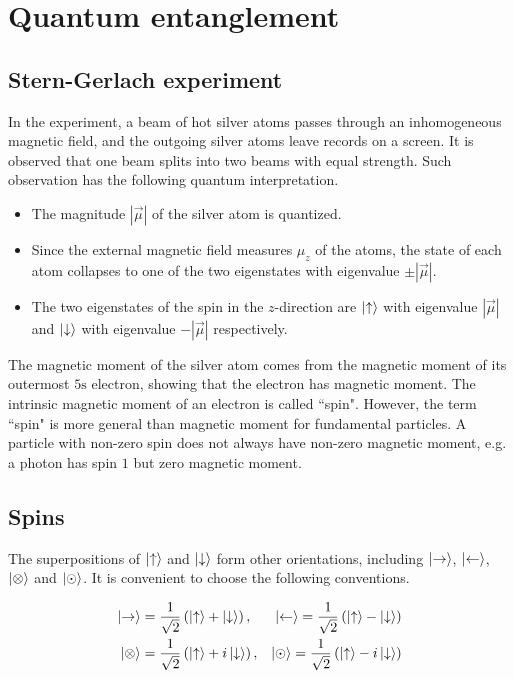 \documentclass[12pt]{book} %
\numberwithin{equation}{chapter}
\begin{document}
\newpage
{} %
\chapter{Quantum entanglement}
\section{Stern-Gerlach experiment}
In the experiment, a beam of hot silver atoms passes through an inhomogeneous magnetic field, and the outgoing silver atoms leave records on a screen. It is observed that one beam splits into two beams with equal strength. Such observation has the following quantum interpretation.
\begin{itembox}
\begin{itemize}
\item The magnitude $|\vec{\mu}|$ of the silver atom is quantized.
\item Since the external magnetic field measures $\mu_{z}$ of the atoms, the state of each atom collapses to one of the two eigenstates with eigenvalue $\pm|\vec{\mu}|$. 
\item The two eigenstates of the spin in the $z$-direction are $\ket{\uparrow}$ with eigenvalue $|\vec{\mu}|$ and $\ket{\downarrow}$ with eigenvalue $-|\vec{\mu}|$ respectively.
\end{itemize}
\end{itembox}
The magnetic moment of the silver atom comes from the magnetic moment of its outermost $5\text{s}$ electron, showing that the electron has magnetic moment. The intrinsic magnetic moment of an electron is called ``spin".\bigskip\newline
However, the term ``spin" is more general than magnetic moment for fundamental particles. A particle with non-zero spin does not always have non-zero magnetic moment, e.g. a photon has spin $1$ but zero magnetic moment.

\section{Spins}
The superpositions of $\ket{\uparrow}$ and $\ket{\downarrow}$ form other orientations, including $\ket{\rightarrow}$, $\ket{\leftarrow}$, $\ket{\otimes}$ and $\ket{\odot}$. It is convenient to choose the following conventions.
\begin{eqnbox}
\begin{align}
\ket{\rightarrow}&=\frac{1}{\sqrt{2}}\left(\ket{\uparrow}+\ket{\downarrow}\right), &\ket{\leftarrow}=\frac{1}{\sqrt{2}}\left(\ket{\uparrow}-\ket{\downarrow}\right)\nonumber\\
\ket{\otimes}&=\frac{1}{\sqrt{2}}\left(\ket{\uparrow}+i\ket{\downarrow}\right), &\ket{\odot}=\frac{1}{\sqrt{2}}\left(\ket{\uparrow}-i\ket{\downarrow}\right)
\end{align}
\end{eqnbox}
\end{document}
